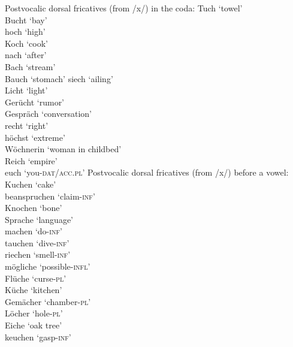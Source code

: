 \ea%
\label{ex:17:2}Postvocalic dorsal fricatives (from /x/) in the coda:
\ea 
\relax [tuːx] \tab Tuch \tab ‘towel’\\
\relax [bʊxt] \tab Bucht \tab ‘bay’\\
\relax [hoːx] \tab hoch \tab ‘high’\\
\relax [kɔx] \tab Koch \tab ‘cook’\\
\relax [nɑːx] \tab nach \tab ‘after’\\
\relax [bɑx] \tab Bach \tab ‘stream’\\
\relax [bɑux] \tab Bauch \tab ‘stomach’
\ex \relax [ziːç] \tab siech \tab ‘ailing’\\
\relax [lɪçt] \tab Licht \tab ‘light’\\
\relax [gəʀʏçt] \tab Gerücht \tab ‘rumor’\\
\relax [gəʃpʀɛːç] \tab Gespräch \tab ‘conversation’\\
\relax [ʀɛçt] \tab recht \tab ‘right’\\
\relax [høːçst] \tab höchst \tab ‘extreme’\\
 \tab Wöchnerin \tab ‘woman in childbed’\\
\relax [ʀɑiç] \tab Reich \tab ‘empire’\\
\relax [ɔyç] \tab euch \tab ‘you-\textsc{dat/acc}.\textsc{pl}’
  \z
\ex%
\label{ex:17:3}Postvocalic dorsal fricatives (from /x/) before a vowel:
\ea \relax [kuːxən] \tab Kuchen \tab ‘cake’\\
\relax [bəɑnʃprʊxən] \tab beanspruchen \tab ‘claim\textsc{{}-inf}’\\
\relax [knɔxən] \tab Knochen \tab ‘bone’\\
\relax [ʃprʀɑːxə] \tab Sprache \tab ‘language’\\
\relax [mɑxən] \tab machen \tab ‘do\textsc{{}-inf}’\\
\relax [tɑuxən] \tab tauchen \tab ‘dive\textsc{{}-inf}’\\
\ex \relax [ʀiːçən] \tab riechen \tab ‘smell\textsc{{}-inf}’\\
\relax [møːklɪçə] \tab mögliche \tab ‘possible\textsc{{}-infl}’\\
\relax [flyːçə] \tab Flüche \tab ‘curse-\textsc{pl}’\\
\relax [kʏçə] \tab Küche \tab ‘kitchen’\\
\relax [gəmɛːçɐ] \tab Gemächer \tab ‘chamber-\textsc{pl}’\\
\relax [lœçɐ] \tab Löcher \tab ‘hole-\textsc{pl}’\\
\relax [ɑiçə] \tab Eiche \tab ‘oak tree’\\
\relax [kɔyçən] \tab keuchen \tab ‘gasp\textsc{{}-inf}’
    \z
\z 


